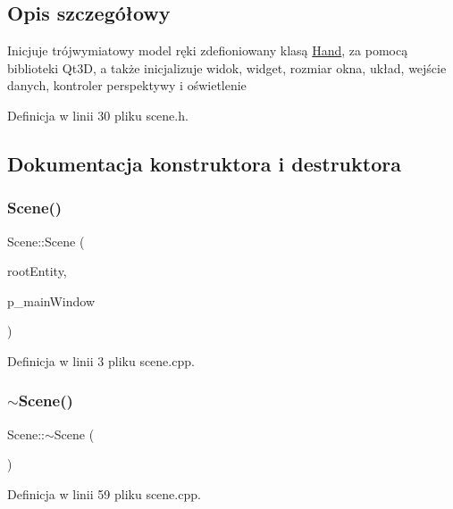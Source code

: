 \subsection{Opis szczegółowy}
Inicjuje trójwymiatowy model ręki zdefioniowany klasą \hyperlink{class_hand}{Hand}, za pomocą biblioteki Qt3D, a także inicjalizuje widok, widget, rozmiar okna, układ, wejście danych, kontroler perspektywy i oświetlenie 

Definicja w linii 30 pliku scene.\+h.



\subsection{Dokumentacja konstruktora i destruktora}
\mbox{\label{class_scene_aa138923bf1d204f6cadbefbe7398d599}} 
\subsubsection{\texorpdfstring{Scene()}{Scene()}}
{\footnotesize\ttfamily Scene\+::\+Scene (\begin{DoxyParamCaption}\item[{Qt3\+D\+Core\+::\+Q\+Entity $\ast$}]{root\+Entity,  }\item[{\hyperlink{class_main_window}{Main\+Window} \&}]{p\+\_\+main\+Window }\end{DoxyParamCaption})\hspace{0.3cm}{\ttfamily [explicit]}}



Definicja w linii 3 pliku scene.\+cpp.

\mbox{\label{class_scene_a3b8cec2e32546713915f8c6303c951f1}} 
\subsubsection{\texorpdfstring{$\sim$\+Scene()}{~Scene()}}
{\footnotesize\ttfamily Scene\+::$\sim$\+Scene (\begin{DoxyParamCaption}{ }\end{DoxyParamCaption})}



Definicja w linii 59 pliku scene.\+cpp.



